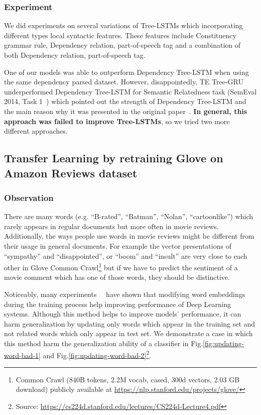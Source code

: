 \subsubsection{Experiment}
We did experiments on several variations of Tree-LSTMs which incorporating different types local syntactic features.
These features include Constituency grammar rule, Dependency relation, part-of-speech tag and a combination of both Dependency relation, part-of-speech tag.

One of our models was able to outperform Dependency Tree-LSTM when using the same dependency parsed dataset.
However, disappointedly, TE Tree-GRU underperformed Dependency Tree-LSTM for Semantic Relatedness task (SemEval 2014, Task 1~\cite{SemeEvalTask1}) which pointed out the strength of Dependency Tree-LSTM and the main reason why it was presented in the original paper~\cite{treeLSTM}.
\textbf{In general, this approach was failed to improve Tree-LSTMs}, so we tried two more different approaches.

\subsection{Transfer Learning by retraining Glove on Amazon Reviews dataset}
\label{sec:second-method}
\subsubsection{Observation}
There are many words (e.g. ``B-rated'', ``Batman'', ``Nolan'', ``cartoonlike'') which rarely appears in regular documents but more often in movie reviews.
Additionally, the ways people use words in movie reviews might be different from their usage in general documents.
For example the vector presentations of ``sympathy'' and ``disappointed'', or ``boom'' and ``insult'' are very close to each other in Glove Common Crawl\footnote{Common Crawl (840B tokens, 2.2M vocab, cased, 300d vectors, 2.03 GB download) publicly available at \url{https://nlp.stanford.edu/projects/glove/}} but if we have to predict the sentiment of a movie comment which has one of those words, they should be distinctive.

Noticeably, many experiments~\cite{treeLSTM}~\cite{KimCNN} have shown that modifying word embeddings during the training process help improving performance of Deep Learning systems.
Although this method helps to improve models' performance, it can harm generalization by updating only words which appear in the training set and not related words which only appear in test set.
We demonstrate a case in which this method harm the generalization ability of a classifier in Fig.\ref{fig:updating-word-bad-1} and Fig.\ref{fig:updating-word-bad-2}\footnote{Source: \url{https://cs224d.stanford.edu/lectures/CS224d-Lecture4.pdf}}.


